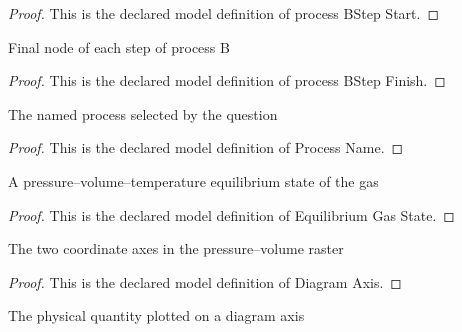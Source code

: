 \begin{proof}
  This is the declared model definition of process BStep Start.
\end{proof}
\begin{definition}
  \label{def:physics:phyx-mini-0495:phyxminiproblems-problemphyxmini0495-processbstepfinish}
  Final node of each step of process B
\end{definition}
\begin{proof}
  This is the declared model definition of process BStep Finish.
\end{proof}
\begin{definition}
  \label{def:physics:phyx-mini-0495:phyxminiproblems-problemphyxmini0495-processname}
  The named process selected by the question
\end{definition}
\begin{proof}
  This is the declared model definition of Process Name.
\end{proof}
\begin{definition}
  \label{def:physics:phyx-mini-0495:phyxminiproblems-problemphyxmini0495-equilibriumgasstate}
  A pressure--volume--temperature equilibrium state of the gas
\end{definition}
\begin{proof}
  This is the declared model definition of Equilibrium Gas State.
\end{proof}
\begin{definition}
  \label{def:physics:phyx-mini-0495:phyxminiproblems-problemphyxmini0495-diagramaxis}
  The two coordinate axes in the pressure--volume raster
\end{definition}
\begin{proof}
  This is the declared model definition of Diagram Axis.
\end{proof}
\begin{definition}
  \label{def:physics:phyx-mini-0495:phyxminiproblems-problemphyxmini0495-axisquantity}
  The physical quantity plotted on a diagram axis
\end{definition}

